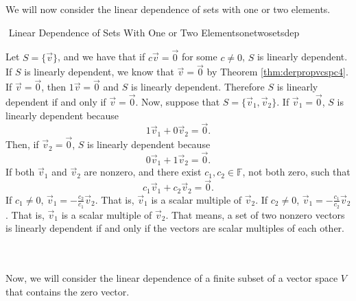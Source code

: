         \pagebreak
        \vphantom
        \\
        \\
        We will now consider the linear dependence of sets with one or two elements.
        \begin{theorem}{\Stop\,\,Linear Dependence of Sets With One or Two Elements}{onetwosetsdep}

            Let \(S=\{\vec{v}\}\), and we have that if \(c\vec{v}=\vec{0}\) for some \(c\neq0\), \(S\) is linearly dependent. If \(S\) is linearly dependent, we know that \(\vec{v}=\vec{0}\) by Theorem \ref{thm:derpropvcspc4}. If \(\vec{v}=\vec{0}\), then \(1\vec{v}=\vec{0}\) and \(S\) is linearly dependent. Therefore \(S\) is linearly dependent if and only if \(\vec{v}=\vec{0}\). Now, suppose that \(S=\{\vec{v}_1,\vec{v}_2\}\). If \(\vec{v}_1=\vec{0}\), \(S\) is linearly dependent because
            \begin{equation*}
                1\vec{v}_1+0\vec{v}_2=\vec{0}.
            \end{equation*}
            Then, if \(\vec{v}_2=\vec{0}\), \(S\) is linearly dependent because
            \begin{equation*}
                0\vec{v}_1+1\vec{v}_2=\vec{0}.
            \end{equation*}
            If both \(\vec{v}_1\) and \(\vec{v}_2\) are nonzero, and there exist \(c_1,c_2\in\mathbb{F}\), not both zero, such that
            \begin{equation*}
                c_1\vec{v}_1+c_2\vec{v}_2=\vec{0}.
            \end{equation*}
            If \(c_1\neq0\), \(\vec{v}_1=-\frac{c_2}{c_1}\vec{v}_2\). That is, \(\vec{v}_1\) is a scalar multiple of \(\vec{v}_2\). If \(c_2\neq0\), \(\vec{v}_1=-\frac{c_1}{c_2}\vec{v}_2\). That is, \(\vec{v}_1\) is a scalar multiple of \(\vec{v}_2\). That means, a set of two nonzero vectors is linearly dependent if and only if the vectors are scalar multiples of each other.
        
        \end{theorem}
        \vphantom
        \\
        \\
        Now, we will consider the linear dependence of a finite subset of a vector space \(V\) that contains the zero vector.
